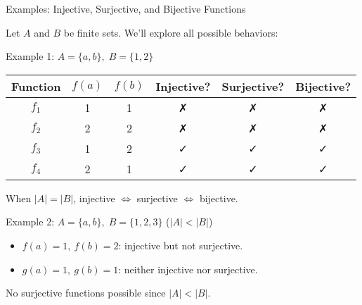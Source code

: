 \documentclass[11pt]{beamer}
\theoremstyle{plain}
\begin{document}

\begin{frame}{Examples: Injective, Surjective, and Bijective Functions}

\small
Let $A$ and $B$ be finite sets. We'll explore all possible behaviors:

\begin{block}{Example 1: $A=\{a,b\},\; B=\{1,2\}$}
\begin{center}
\begin{tabular}{c|cc|c|c|c}
\toprule
Function & $f(a)$ & $f(b)$ & Injective? & Surjective? & Bijective? \\
\midrule
$f_1$ & 1 & 1 & ✗ & ✗ & ✗ \\
$f_2$ & 2 & 2 & ✗ & ✗ & ✗ \\
$f_3$ & 1 & 2 & ✓ & ✓ & ✓ \\
$f_4$ & 2 & 1 & ✓ & ✓ & ✓ \\
\bottomrule
\end{tabular}
\end{center}
\pause
\vspace{3pt}
When $|A|=|B|$, injective $\Leftrightarrow$ surjective $\Leftrightarrow$ bijective.
\end{block}

\pause
\begin{block}{Example 2: $A=\{a,b\},\; B=\{1,2,3\}$ ($|A|<|B|$)}
\pause
\begin{itemize}
    \item $f(a)=1,\ f(b)=2$: injective but not surjective.
    \item $g(a)=1,\ g(b)=1$: neither injective nor surjective.
\end{itemize}
No surjective functions possible since $|A|<|B|$.
\end{block}
\end{frame}
\end{document}
